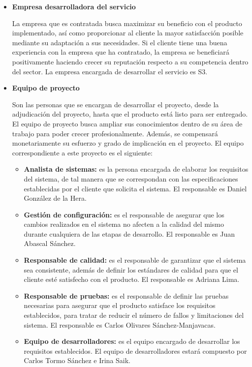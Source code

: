\begin{itemize}[-]
\item \textbf{Empresa desarrolladora del servicio}
\par La empresa que es contratada busca maximizar su beneficio con el producto implementado, así como proporcionar al cliente la mayor satisfacción posible mediante su adaptación a sus necesidades. Si el cliente tiene una buena experiencia con la empresa que ha contratado, la empresa se beneficiará positivamente haciendo crecer su reputación respecto a su competencia dentro del sector. La empresa encargada de desarrollar el servicio es S3.
\item \textbf{Equipo de proyecto}
\par Son las personas que se encargan de desarrollar el proyecto, desde la adjudicación del proyecto, hasta que el producto está listo para ser entregado. El equipo de proyecto busca ampliar sus conocimientos dentro de su área de trabajo para poder crecer profesionalmente. Además, se compensará monetariamente su esfuerzo y grado de implicación en el proyecto. El equipo correspondiente a este proyecto es el siguiente:
\begin{itemize}[-]
\item \textbf{Analista de sistemas:}
es la persona encargada de elaborar los requisitos del sistema, de tal manera que se correspondan con las especificaciones establecidas por el cliente que solicita el sistema. El responsable es Daniel González de la Hera.
\item \textbf{Gestión de configuración:}
es el responsable de asegurar que los cambios realizados en el sistema no afecten a la calidad del mismo durante cualquiera de las etapas de desarrollo. El responsable es Juan Abascal Sánchez.
\item \textbf{Responsable de calidad:}
es el responsable de garantizar que el sistema sea consistente, además de definir los estándares de calidad para que el cliente esté satisfecho con el producto. El responsable es Adriana Lima.
\item \textbf{Responsable de pruebas:}
es el responsable de definir las pruebas necesarias para asegurar que el producto satisface los requisitos establecidos, para tratar de reducir el número de fallos y limitaciones del sistema. El responsable es Carlos Olivares Sánchez-Manjavacas.
\item \textbf{Equipo de desarrolladores:}
es el equipo encargado de desarrollar los requisitos establecidos. El equipo de desarrolladores estará compuesto por Carlos Tormo Sánchez e Irina Saik.

\end{itemize}
\end{itemize}
